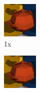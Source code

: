 \documentclass[a4paper, twocolumn]{article}
\begin{document}
            \begin{figure}[ht]
                \centering
                \begin{subfigure}{0.32\linewidth}
                    \centering
                    \label{fig:aliasing1x}
                    \includegraphics[width=\linewidth]{share/aliasing_1x.png}
                    \caption{1x}
                \end{subfigure} \hfill
                \begin{subfigure}{0.32\linewidth}
                    \centering
                    \label{fig:aliasing4x}
                    \includegraphics[width=\linewidth]{share/aliasing_4x.png}

\end{subfigure}
\end{figure}
\end{document}
